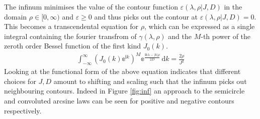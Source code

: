 \documentclass{article}[12pt]
\numberwithin{equation}{section}
\begin{document}
The infinum minimises the value of the contour function $\varepsilon(\lambda,\rho|J,D)$
in the domain $\rho\in[0,\infty)$ and $\varepsilon\geq0$ and thus picks out the contour
at $\varepsilon(\lambda,\rho|J,D)=0$. This becomes a transcendental equation for
$\rho$, which can be expressed as a single integral containing the fourier transfrom of
$\gamma(\lambda,\rho)$ and the $M$-th power of the zeroth order Bessel function of the first
kind $J_0(k)$.
\begin{align}
        \int_{-\infty}^{\infty}\!
          \left(J_0(k)\mathbb{e}^{\mathbb{i}k}\right)^M
          \mathbb{e}^{\frac{\mathbb{i}k\lambda-|k|\rho}{2D}}
        \,\mathrm{d}k
    =\frac{2\rho}{J^2}\label{eq:density}
\end{align}
Looking at the functional form of the above equation indicates that different choices
for $J,D$ amount to shifting and scaling such that the infinum picks out neighbouring
contours. Indeed in Figure \ref{fig:inf} an approach to the semicircle and convoluted
arcsine laws can be seen for positive and negative contours respectively.
\end{document}

